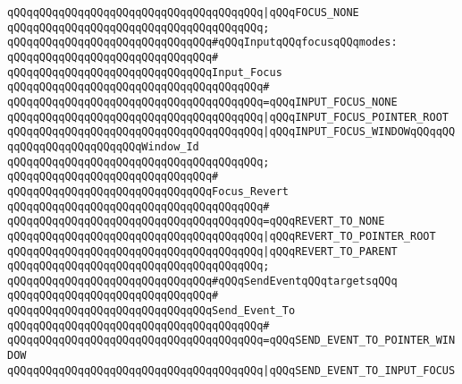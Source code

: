 \verb|qQQqqQQqqQQqqQQqqQQqqQQqqQQqqQQqqQQqqQQq|\verb#|qQQqFOCUS_NONE#\newline
\verb|qQQqqQQqqQQqqQQqqQQqqQQqqQQqqQQqqQQqqQQq;|\newline
\newline
\verb|qQQqqQQqqQQqqQQqqQQqqQQqqQQqqQQq#qQQqInputqQQqfocusqQQqmodes:|\newline
\verb|qQQqqQQqqQQqqQQqqQQqqQQqqQQqqQQq#|\newline
\verb|qQQqqQQqqQQqqQQqqQQqqQQqqQQqqQQqInput_Focus|\newline
\verb|qQQqqQQqqQQqqQQqqQQqqQQqqQQqqQQqqQQqqQQq#|\newline
\verb|qQQqqQQqqQQqqQQqqQQqqQQqqQQqqQQqqQQqqQQq=qQQqINPUT_FOCUS_NONE|\newline
\verb|qQQqqQQqqQQqqQQqqQQqqQQqqQQqqQQqqQQqqQQq|\verb#|qQQqINPUT_FOCUS_POINTER_ROOT#\newline
\verb|qQQqqQQqqQQqqQQqqQQqqQQqqQQqqQQqqQQqqQQq|\verb#|qQQqINPUT_FOCUS_WINDOWqQQqqQQqqQQqqQQqqQQqqQQqqQQqWindow_Id#\newline
\verb|qQQqqQQqqQQqqQQqqQQqqQQqqQQqqQQqqQQqqQQq;|\newline
\verb|qQQqqQQqqQQqqQQqqQQqqQQqqQQqqQQq#|\newline
\verb|qQQqqQQqqQQqqQQqqQQqqQQqqQQqqQQqFocus_Revert|\newline
\verb|qQQqqQQqqQQqqQQqqQQqqQQqqQQqqQQqqQQqqQQq#|\newline
\verb|qQQqqQQqqQQqqQQqqQQqqQQqqQQqqQQqqQQqqQQq=qQQqREVERT_TO_NONE|\newline
\verb|qQQqqQQqqQQqqQQqqQQqqQQqqQQqqQQqqQQqqQQq|\verb#|qQQqREVERT_TO_POINTER_ROOT#\newline
\verb|qQQqqQQqqQQqqQQqqQQqqQQqqQQqqQQqqQQqqQQq|\verb#|qQQqREVERT_TO_PARENT#\newline
\verb|qQQqqQQqqQQqqQQqqQQqqQQqqQQqqQQqqQQqqQQq;|\newline
\newline
\verb|qQQqqQQqqQQqqQQqqQQqqQQqqQQqqQQq#qQQqSendEventqQQqtargetsqQQq|\newline
\verb|qQQqqQQqqQQqqQQqqQQqqQQqqQQqqQQq#|\newline
\verb|qQQqqQQqqQQqqQQqqQQqqQQqqQQqqQQqSend_Event_To|\newline
\verb|qQQqqQQqqQQqqQQqqQQqqQQqqQQqqQQqqQQqqQQq#|\newline
\verb|qQQqqQQqqQQqqQQqqQQqqQQqqQQqqQQqqQQqqQQq=qQQqSEND_EVENT_TO_POINTER_WINDOW|\newline
\verb|qQQqqQQqqQQqqQQqqQQqqQQqqQQqqQQqqQQqqQQq|\verb#|qQQqSEND_EVENT_TO_INPUT_FOCUS#\newline
